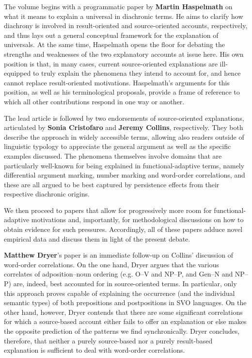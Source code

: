\documentclass[output=paper]{langsci/langscibook}
\begin{document}
The volume begins with a programmatic paper by \textbf{Martin Haspelmath} on what it means to explain a universal in diachronic terms. He aims to clarify how diachrony is involved in result-oriented and source-oriented accounts, respectively, and thus lays out a general conceptual framework for the explanation of universals. At the same time, Haspelmath opens the floor for debating the strengths and weaknesses of the two explanatory accounts at issue here. His own position is that, in many cases, current source-oriented explanations are ill-equipped to truly explain the phenomena they intend to account for, and hence cannot replace result-oriented motivations. Haspelmath’s arguments for this position, as well as his terminological proposals, provide a frame of reference to which all other contributions respond in one way or another.

The lead article is followed by two endorsements of source-oriented explanations, articulated by \textbf{Sonia Cristofaro} and \textbf{Jeremy Collins}, respectively. They both describe the approach in widely accessible terms, allowing also readers outside of linguistic typology to appreciate the general argument as well as the specific examples discussed. The phenomena themselves involve domains that are particularly well-known for being explained in functional-adaptive terms, namely differential argument marking, number marking and word-order correlations, and these are all argued to be best captured by persistence effects from their respective diachronic origins.  

We then proceed to papers that allow for progressively more room for functional-adaptive motivations and, importantly, for methodological discussions on how to obtain evidence for such pressures. Accordingly, all of these papers adduce novel empirical data and discuss them in light of the present debate.

\textbf{Matthew Dryer}’s paper is an immediate follow-up on Collins’ discussion of word-order correlations. On the one hand, Dryer argues that the various correlates of adposition–noun ordering (e.g. O–V and NP–P, and Gen–N and NP–P) are, indeed, best accounted for in source-oriented terms. In particular, only this approach proves capable of explaining the occurrence (and the individual semantic types) of both prepositions and postpositions in SVO languages. On the other hand, however, Dryer contends that there are some significant correlations for which a source-based account either fails to offer an explanation or else makes the opposite prediction of the patterns we find synchronically. Dryer concludes, therefore, that neither a purely source-based nor a purely result-based explanation is sufficient to deal with word-order correlations.      
\end{document}
